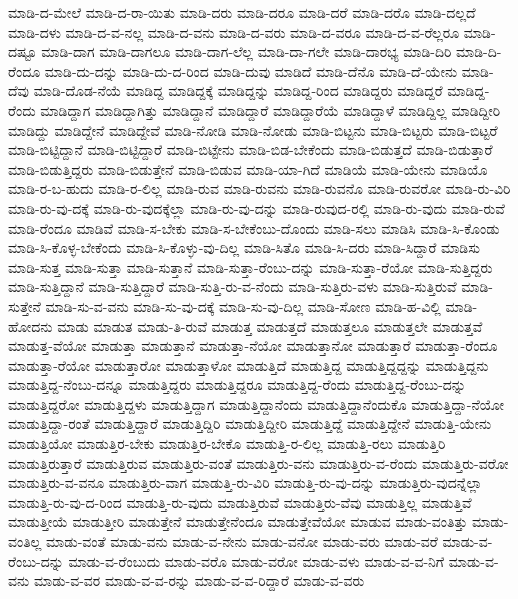 ಮಾಡಿ-ದ-ಮೇಲೆ
ಮಾಡಿ-ದ-ರಾ-ಯಿತು
ಮಾಡಿ-ದರು
ಮಾಡಿ-ದರೂ
ಮಾಡಿ-ದರೆ
ಮಾಡಿ-ದರೊ
ಮಾಡಿ-ದಲ್ಲದೆ
ಮಾಡಿ-ದಳು
ಮಾಡಿ-ದ-ವ-ನಲ್ಲ
ಮಾಡಿ-ದ-ವನು
ಮಾಡಿ-ದ-ವರು
ಮಾಡಿ-ದ-ವರೂ
ಮಾಡಿ-ದ-ವ-ರೆಲ್ಲರೂ
ಮಾಡಿ-ದಷ್ಟೂ
ಮಾಡಿ-ದಾಗ
ಮಾಡಿ-ದಾಗಲೂ
ಮಾಡಿ-ದಾಗ-ಲೆಲ್ಲ
ಮಾಡಿ-ದಾ-ಗಲೇ
ಮಾಡಿ-ದಾರಭ್ಯ
ಮಾಡಿ-ದಿರಿ
ಮಾಡಿ-ದಿ-ರೆಂದೂ
ಮಾಡಿ-ದು-ದನ್ನು
ಮಾಡಿ-ದು-ದ-ರಿಂದ
ಮಾಡಿ-ದುವು
ಮಾಡಿದೆ
ಮಾಡಿ-ದೆನೊ
ಮಾಡಿ-ದೆ-ಯೇನು
ಮಾಡಿ-ದೆವು
ಮಾಡಿ-ದೊಡ-ನೆಯೆ
ಮಾಡಿದ್ದ
ಮಾಡಿದ್ದಕ್ಕೆ
ಮಾಡಿದ್ದನ್ನು
ಮಾಡಿದ್ದ-ರಿಂದ
ಮಾಡಿದ್ದರು
ಮಾಡಿದ್ದರೆ
ಮಾಡಿದ್ದ-ರೆಂದು
ಮಾಡಿದ್ದಾಗ
ಮಾಡಿದ್ದಾಗಿತ್ತು
ಮಾಡಿದ್ದಾನೆ
ಮಾಡಿದ್ದಾರೆ
ಮಾಡಿದ್ದಾರೆಯೆ
ಮಾಡಿದ್ದಾಳೆ
ಮಾಡಿದ್ದಿಲ್ಲ
ಮಾಡಿದ್ದೀರಿ
ಮಾಡಿದ್ದು
ಮಾಡಿದ್ದೇನೆ
ಮಾಡಿದ್ದೇವೆ
ಮಾಡಿ-ನೋಡಿ
ಮಾಡಿ-ನೋಡು
ಮಾಡಿ-ಬಿಟ್ಟನು
ಮಾಡಿ-ಬಿಟ್ಟರು
ಮಾಡಿ-ಬಿಟ್ಟರೆ
ಮಾಡಿ-ಬಿಟ್ಟಿದ್ದಾನೆ
ಮಾಡಿ-ಬಿಟ್ಟಿದ್ದಾರೆ
ಮಾಡಿ-ಬಿಟ್ಟೇನು
ಮಾಡಿ-ಬಿಡ-ಬೇಕೆಂದು
ಮಾಡಿ-ಬಿಡುತ್ತದೆ
ಮಾಡಿ-ಬಿಡುತ್ತಾರೆ
ಮಾಡಿ-ಬಿಡುತ್ತಿದ್ದರು
ಮಾಡಿ-ಬಿಡುತ್ತೇನೆ
ಮಾಡಿ-ಬಿಡುವ
ಮಾಡಿ-ಯಾ-ಗಿದೆ
ಮಾಡಿಯೆ
ಮಾಡಿ-ಯೇನು
ಮಾಡಿಯೊ
ಮಾಡಿ-ರ-ಬ-ಹುದು
ಮಾಡಿ-ರ-ಲಿಲ್ಲ
ಮಾಡಿ-ರುವ
ಮಾಡಿ-ರುವನು
ಮಾಡಿ-ರುವನೊ
ಮಾಡಿ-ರುವರೋ
ಮಾಡಿ-ರು-ವಿರಿ
ಮಾಡಿ-ರು-ವು-ದಕ್ಕೆ
ಮಾಡಿ-ರು-ವುದಕ್ಕೆಲ್ಲಾ
ಮಾಡಿ-ರು-ವು-ದನ್ನು
ಮಾಡಿ-ರುವುದ-ರಲ್ಲಿ
ಮಾಡಿ-ರು-ವುದು
ಮಾಡಿ-ರುವೆ
ಮಾಡಿ-ರೆಂದೂ
ಮಾಡಿವೆ
ಮಾಡಿ-ಸ-ಬೇಕು
ಮಾಡಿ-ಸ-ಬೇಕೆಂಬು-ದೊಂದು
ಮಾಡಿ-ಸಲು
ಮಾಡಿಸಿ
ಮಾಡಿ-ಸಿ-ಕೊಂಡು
ಮಾಡಿ-ಸಿ-ಕೊಳ್ಳ-ಬೇಕೆಂದು
ಮಾಡಿ-ಸಿ-ಕೊಳ್ಳು-ವು-ದಿಲ್ಲ
ಮಾಡಿ-ಸಿತೊ
ಮಾಡಿ-ಸಿ-ದರು
ಮಾಡಿ-ಸಿದ್ದಾರೆ
ಮಾಡಿಸು
ಮಾಡಿ-ಸುತ್ತ
ಮಾಡಿ-ಸುತ್ತಾ
ಮಾಡಿ-ಸುತ್ತಾನೆ
ಮಾಡಿ-ಸುತ್ತಾ-ರೆಂಬು-ದನ್ನು
ಮಾಡಿ-ಸುತ್ತಾ-ರೆಯೋ
ಮಾಡಿ-ಸುತ್ತಿದ್ದರು
ಮಾಡಿ-ಸುತ್ತಿದ್ದಾನೆ
ಮಾಡಿ-ಸುತ್ತಿದ್ದಾರೆ
ಮಾಡಿ-ಸುತ್ತಿ-ರು-ವ-ನೆಂದು
ಮಾಡಿ-ಸುತ್ತಿರು-ವಳು
ಮಾಡಿ-ಸುತ್ತಿರುವೆ
ಮಾಡಿ-ಸುತ್ತೇನೆ
ಮಾಡಿ-ಸು-ವ-ವನು
ಮಾಡಿ-ಸು-ವು-ದಕ್ಕೆ
ಮಾಡಿ-ಸು-ವು-ದಿಲ್ಲ
ಮಾಡಿ-ಸೋಣ
ಮಾಡಿ-ಹ-ವಿಲ್ಲಿ
ಮಾಡಿ-ಹೋದನು
ಮಾಡು
ಮಾಡುತ
ಮಾಡು-ತಿ-ರುವೆ
ಮಾಡುತ್ತ
ಮಾಡುತ್ತದೆ
ಮಾಡುತ್ತಲೂ
ಮಾಡುತ್ತಲೇ
ಮಾಡುತ್ತವೆ
ಮಾಡುತ್ತ-ವೆಯೋ
ಮಾಡುತ್ತಾ
ಮಾಡುತ್ತಾನೆ
ಮಾಡುತ್ತಾ-ನೆಯೋ
ಮಾಡುತ್ತಾನೋ
ಮಾಡುತ್ತಾರೆ
ಮಾಡುತ್ತಾ-ರೆಂದೂ
ಮಾಡುತ್ತಾ-ರೆಯೋ
ಮಾಡುತ್ತಾರೋ
ಮಾಡುತ್ತಾಳೋ
ಮಾಡುತ್ತಿದೆ
ಮಾಡುತ್ತಿದ್ದ
ಮಾಡುತ್ತಿದ್ದದ್ದನ್ನು
ಮಾಡುತ್ತಿದ್ದನು
ಮಾಡುತ್ತಿದ್ದ-ನೆಂಬು-ದನ್ನೂ
ಮಾಡುತ್ತಿದ್ದರು
ಮಾಡುತ್ತಿದ್ದರೂ
ಮಾಡುತ್ತಿದ್ದ-ರೆಂದು
ಮಾಡುತ್ತಿದ್ದ-ರೆಂಬು-ದನ್ನು
ಮಾಡುತ್ತಿದ್ದರೋ
ಮಾಡುತ್ತಿದ್ದಳು
ಮಾಡುತ್ತಿದ್ದಾಗ
ಮಾಡುತ್ತಿದ್ದಾನೆಂದು
ಮಾಡುತ್ತಿದ್ದಾನೆಂದುಕೊ
ಮಾಡುತ್ತಿದ್ದಾ-ನೆಯೋ
ಮಾಡುತ್ತಿದ್ದಾ-ರಂತೆ
ಮಾಡುತ್ತಿದ್ದಾರೆ
ಮಾಡುತ್ತಿದ್ದಿರಿ
ಮಾಡುತ್ತಿದ್ದೀರಿ
ಮಾಡುತ್ತಿದ್ದೆ
ಮಾಡುತ್ತಿದ್ದೇನೆ
ಮಾಡುತ್ತಿ-ಯೇನು
ಮಾಡುತ್ತಿಯೋ
ಮಾಡುತ್ತಿರ-ಬೇಕು
ಮಾಡುತ್ತಿರ-ಬೇಕೊ
ಮಾಡುತ್ತಿ-ರ-ಲಿಲ್ಲ
ಮಾಡುತ್ತಿ-ರಲು
ಮಾಡುತ್ತಿರಿ
ಮಾಡುತ್ತಿರುತ್ತಾರೆ
ಮಾಡುತ್ತಿರುವ
ಮಾಡುತ್ತಿರು-ವಂತೆ
ಮಾಡುತ್ತಿರು-ವನು
ಮಾಡುತ್ತಿರು-ವ-ರೆಂದು
ಮಾಡುತ್ತಿರು-ವರೋ
ಮಾಡುತ್ತಿರು-ವ-ವನೂ
ಮಾಡುತ್ತಿರು-ವಾಗ
ಮಾಡುತ್ತಿ-ರು-ವಿರಿ
ಮಾಡುತ್ತಿ-ರು-ವು-ದನ್ನು
ಮಾಡುತ್ತಿರು-ವುದನ್ನೆಲ್ಲಾ
ಮಾಡುತ್ತಿ-ರು-ವು-ದ-ರಿಂದ
ಮಾಡುತ್ತಿ-ರು-ವುದು
ಮಾಡುತ್ತಿರುವೆ
ಮಾಡುತ್ತಿರು-ವೆವು
ಮಾಡುತ್ತಿಲ್ಲ
ಮಾಡುತ್ತಿವೆ
ಮಾಡುತ್ತೀಯೆ
ಮಾಡುತ್ತೀರಿ
ಮಾಡುತ್ತೇನೆ
ಮಾಡುತ್ತೇನೆಂದೂ
ಮಾಡುತ್ತೇವೆಯೋ
ಮಾಡುವ
ಮಾಡು-ವಂತಿತ್ತು
ಮಾಡು-ವಂತಿಲ್ಲ
ಮಾಡು-ವಂತೆ
ಮಾಡು-ವನು
ಮಾಡು-ವ-ನೇನು
ಮಾಡು-ವನೋ
ಮಾಡು-ವರು
ಮಾಡು-ವರೆ
ಮಾಡು-ವ-ರೆಂಬು-ದನ್ನು
ಮಾಡು-ವ-ರೆಂಬುದು
ಮಾಡು-ವರೊ
ಮಾಡು-ವರೋ
ಮಾಡು-ವಳು
ಮಾಡು-ವ-ವ-ನಿಗೆ
ಮಾಡು-ವ-ವನು
ಮಾಡು-ವ-ವರ
ಮಾಡು-ವ-ವ-ರನ್ನು
ಮಾಡು-ವ-ವ-ರಿದ್ದಾರೆ
ಮಾಡು-ವ-ವರು
